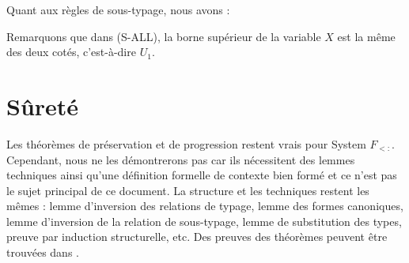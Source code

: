 
Quant aux règles de sous-typage, nous avons :


Remarquons que dans (S-ALL), la borne supérieur de la variable $X$ est la même
des deux cotés, c'est-à-dire $U_{1}$.

\section{Sûreté}

Les théorèmes de préservation et de progression restent vrais pour System
$F_{<:}$. Cependant, nous ne les démontrerons pas car ils nécessitent des lemmes
techniques ainsi qu'une définition formelle de contexte bien formé et ce n'est
pas le sujet principal de ce document. La structure
et les techniques restent les mêmes : lemme d'inversion des relations de typage,
lemme des formes canoniques, lemme d'inversion de la relation de sous-typage, lemme de
substitution des types, preuve par induction structurelle, etc.
Des preuves des théorèmes peuvent être trouvées dans
\cite{tapl-bounded-quantification}.